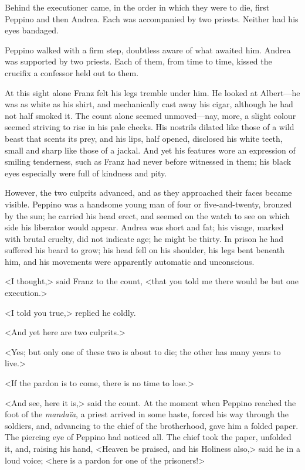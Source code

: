  Behind the executioner came, in the order in which they were to die, first Peppino and then Andrea. Each was accompanied by two priests. Neither had his eyes bandaged. 

 Peppino walked with a firm step, doubtless aware of what awaited him. Andrea was supported by two priests. Each of them, from time to time, kissed the crucifix a confessor held out to them. 

 At this sight alone Franz felt his legs tremble under him. He looked at Albert—he was as white as his shirt, and mechanically cast away his cigar, although he had not half smoked it. The count alone seemed unmoved—nay, more, a slight colour seemed striving to rise in his pale cheeks. His nostrils dilated like those of a wild beast that scents its prey, and his lips, half opened, disclosed his white teeth, small and sharp like those of a jackal. And yet his features wore an expression of smiling tenderness, such as Franz had never before witnessed in them; his black eyes especially were full of kindness and pity. 

 However, the two culprits advanced, and as they approached their faces became visible. Peppino was a handsome young man of four or five-and-twenty, bronzed by the sun; he carried his head erect, and seemed on the watch to see on which side his liberator would appear. Andrea was short and fat; his visage, marked with brutal cruelty, did not indicate age; he might be thirty. In prison he had suffered his beard to grow; his head fell on his shoulder, his legs bent beneath him, and his movements were apparently automatic and unconscious. 

 <I thought,> said Franz to the count, <that you told me there would be but one execution.> 

 <I told you true,> replied he coldly. 

 <And yet here are two culprits.> 

 <Yes; but only one of these two is about to die; the other has many years to live.> 

 <If the pardon is to come, there is no time to lose.> 

 <And see, here it is,> said the count. At the moment when Peppino reached the foot of the \textit{mandaïa}, a priest arrived in some haste, forced his way through the soldiers, and, advancing to the chief of the brotherhood, gave him a folded paper. The piercing eye of Peppino had noticed all. The chief took the paper, unfolded it, and, raising his hand, <Heaven be praised, and his Holiness also,> said he in a loud voice; <here is a pardon for one of the prisoners!> 

